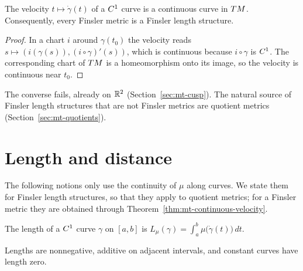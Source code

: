 \begin{theorem}
  \label{thm:mt-continuous-velocity}
  \leanok
  The velocity $t \mapsto \dot\gamma(t)$ of a $C^{1}$ curve is a continuous curve in $T M$.
  Consequently, every Finsler metric is a Finsler length structure.
\end{theorem}

\begin{proof}
  \leanok
  In a chart $i$ around $\gamma(t_0)$ the velocity reads $s \mapsto (i(\gamma(s)), (i \circ
  \gamma)'(s))$, which is continuous because $i \circ \gamma$ is $C^{1}$. The corresponding chart
  of $T M$ is a homeomorphism onto its image, so the velocity is continuous near $t_0$.
\end{proof}

The converse fails, already on $\mathbb{R}^2$ (Section~\ref{sec:mt-cusp}). The natural source of Finsler
length structures that are not Finsler metrics are quotient metrics (Section~\ref{sec:mt-quotients}).

\section{Length and distance}

The following notions only use the continuity of $\mu$ along curves. We state them for Finsler
length structures, so that they apply to quotient metrics; for a Finsler metric they are obtained
through Theorem~\ref{thm:mt-continuous-velocity}.

\begin{definition}[Length]
  \label{def:mt-length}
  \leanok
  The length of a $C^{1}$ curve $\gamma$ on $[a, b]$ is
  $L_\mu(\gamma) = \int_a^b \mu\bigl(\dot\gamma(t)\bigr)\, dt$.
\end{definition}

\begin{proposition}
  \label{prop:mt-length}
  \leanok
  Lengths are nonnegative, additive on adjacent intervals, and constant curves have length zero.
\end{proposition}

